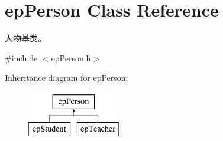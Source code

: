 \hypertarget{classepPerson}{\section{ep\-Person \-Class \-Reference}
\label{classepPerson}
}


人物基类。  




{\ttfamily \#include $<$ep\-Person.\-h$>$}

\-Inheritance diagram for ep\-Person\-:\begin{figure}[H]
\begin{center}
\leavevmode
\includegraphics[height=2.000000cm]{classepPerson}
\end{center}
\end{figure}
